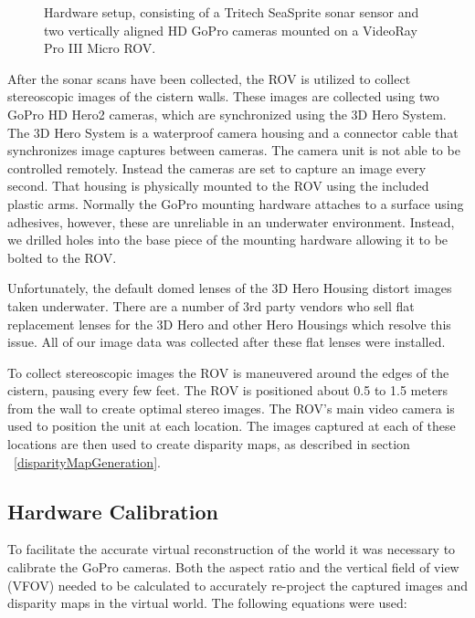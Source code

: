 \documentclass[a4paper,twoside]{article}
\begin{document}
\begin{figure}[!h]
   \vspace{-0.2cm}
   \caption{Hardware setup, consisting of a Tritech SeaSprite sonar sensor and two vertically aligned HD GoPro cameras mounted on a VideoRay Pro III Micro ROV.}
  \label{fig:ROV}
 \end{figure}

After the sonar scans have been collected, the ROV is utilized to collect stereoscopic images of the cistern walls.
These images are collected using two GoPro HD Hero2 cameras, which are synchronized using the 3D Hero System.  
The 3D Hero System is a waterproof camera housing and a connector cable that synchronizes image captures between cameras.
The camera unit is not able to be controlled remotely.  
Instead the cameras are set to capture an image every second.
That housing is physically mounted to the ROV using the included plastic arms. 
Normally the GoPro mounting hardware attaches to a surface using adhesives, however, these are unreliable in an underwater environment.  
Instead, we drilled holes into the base piece of the mounting hardware allowing it to be bolted to the ROV.    

Unfortunately, the default domed lenses of the 3D Hero Housing distort images taken underwater.  
There are a number of 3rd party vendors who sell flat replacement lenses for the 3D Hero and other Hero Housings which resolve this issue.  
All of our image data was collected after these flat lenses were installed.

To collect stereoscopic images the ROV is maneuvered around the edges of the cistern, pausing every few feet.  
The ROV is positioned about 0.5 to 1.5 meters from the wall to create optimal stereo images.  
The ROV's main video camera is used to position the unit at each location.  
The images captured at each of these locations are then used to create disparity maps, as described in section ~\ref{disparityMapGeneration}.



\subsection{Hardware Calibration}
To facilitate the accurate virtual reconstruction of the world it was necessary to calibrate the GoPro cameras.
  Both the aspect ratio and the vertical field of view (VFOV) needed to be calculated to accurately re-project the captured images and disparity maps in the virtual world.  
The following equations were used:
\end{document}
